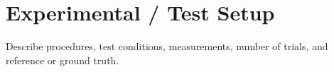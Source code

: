 \section{Experimental / Test Setup}

Describe procedures, test conditions, measurements, 
number of trials, and reference or ground truth.